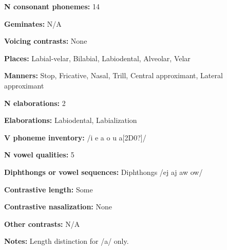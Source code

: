 \begin{styleBody}
\textbf{N consonant phonemes:} 14
\end{styleBody}

\begin{styleBody}
\textbf{Geminates:} N/A
\end{styleBody}

\begin{styleBody}
\textbf{Voicing contrasts:} None
\end{styleBody}

\begin{styleBody}
\textbf{Places:} Labial-velar, Bilabial, Labiodental, Alveolar, Velar
\end{styleBody}

\begin{styleBody}
\textbf{Manners:} Stop, Fricative, Nasal, Trill, Central approximant, Lateral approximant
\end{styleBody}

\begin{styleBody}
\textbf{N elaborations:} 2
\end{styleBody}

\begin{styleBody}
\textbf{Elaborations:} Labiodental, Labialization
\end{styleBody}

\begin{styleBody}
\textbf{V phoneme inventory:} /i e a o u a[2D0?]/
\end{styleBody}

\begin{styleBody}
\textbf{N vowel qualities:} 5
\end{styleBody}

\begin{styleBody}
\textbf{Diphthongs or vowel sequences:} Diphthongs /ej aj aw ow/
\end{styleBody}

\begin{styleBody}
\textbf{Contrastive length:} Some
\end{styleBody}

\begin{styleBody}
\textbf{Contrastive nasalization:} None
\end{styleBody}

\begin{styleBody}
\textbf{Other contrasts:} N/A
\end{styleBody}

\begin{styleBody}
\textbf{Notes:} Length distinction for /a/ only.
\end{styleBody}

